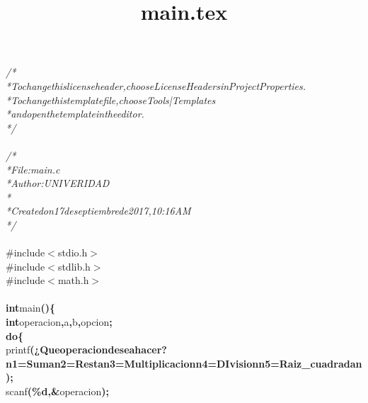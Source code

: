\documentclass[a4paper, 10pt]{article}
\title{main.tex}
\newcommand\SPC{\hspace*{0.6em}}
\newcommand\BS{\mbox{\char 92}}
\newcommand\QOT{\mbox{\char 34}}
\newcommand{\CppAComment}[1]{\textit{\textcolor[rgb]{0.2,0.6,1}{#1}}}
\newcommand{\CppAIdentifier}[1]{#1}
\newcommand{\CppAPreprocessor}[1]{\textcolor[rgb]{0,0.5,0}{#1}}
\newcommand{\CppAReservedWord}[1]{\textbf{#1}}
\newcommand{\CppASpace}[1]{\colorbox[rgb]{1,1,1}{#1}}
\newcommand{\CppAString}[1]{\textbf{\textcolor[rgb]{0,0,1}{#1}}}
\newcommand{\CppASymbol}[1]{\textbf{\textcolor[rgb]{1,0,0}{#1}}}
\begin{document}
\begin{ttfamily}
\noindent
\CppAComment{/*}\\
\CppAComment{\SPC *\SPC To\SPC change\SPC this\SPC license\SPC header,\SPC choose\SPC License\SPC Headers\SPC in\SPC Project\SPC Properties.}\\
\CppAComment{\SPC *\SPC To\SPC change\SPC this\SPC template\SPC file,\SPC choose\SPC Tools\SPC |\SPC Templates}\\
\CppAComment{\SPC *\SPC and\SPC open\SPC the\SPC template\SPC in\SPC the\SPC editor.}\\
\CppAComment{\SPC */}\\
\\
\CppAComment{/*\SPC }\\
\CppAComment{\SPC *\SPC File:\SPC \SPC \SPC main.c}\\
\CppAComment{\SPC *\SPC Author:\SPC UNIVERIDAD}\\
\CppAComment{\SPC *}\\
\CppAComment{\SPC *\SPC Created\SPC on\SPC 17\SPC de\SPC septiembre\SPC de\SPC 2017,\SPC 10:16\SPC AM}\\
\CppAComment{\SPC */}\\
\\
\CppAPreprocessor{\#include\SPC $<$stdio.h$>$}\\
\CppAPreprocessor{\#include\SPC $<$stdlib.h$>$}\\
\CppAPreprocessor{\#include\SPC $<$math.h$>$}\\
\\
\CppAReservedWord{int}\CppASpace{\SPC }\CppAIdentifier{main}\CppASymbol{(}\CppASymbol{)}\CppASymbol{\{}\\
\CppASpace{\SPC \SPC \SPC \SPC }\CppAReservedWord{int}\CppASpace{\SPC }\CppAIdentifier{operacion}\CppASymbol{,}\CppAIdentifier{a}\CppASymbol{,}\CppASpace{\SPC }\CppAIdentifier{b}\CppASymbol{,}\CppASpace{\SPC }\CppAIdentifier{opcion}\CppASymbol{;}\\
\CppASpace{\SPC \SPC \SPC \SPC }\CppAReservedWord{do}\CppASymbol{\{}\\
\CppASpace{\SPC \SPC \SPC \SPC }\CppAIdentifier{printf}\CppASymbol{(}\CppAString{\QOT ¿Que\SPC operacion\SPC desea\SPC hacer?\BS n\SPC 1=Suma\BS n\SPC 2=Resta\BS n\SPC 3=Multiplicacion\BS n\SPC 4=DIvision\BS n\SPC 5=Raiz\_cuadrada\BS n\QOT }\CppASymbol{)}\CppASymbol{;}\\
\CppASpace{\SPC \SPC \SPC \SPC }\CppAIdentifier{scanf}\CppASymbol{(}\CppAString{\QOT \%d\QOT }\CppASymbol{,}\CppASymbol{\&}\CppAIdentifier{operacion}\CppASymbol{)}\CppASymbol{;}\\

\end{ttfamily}
\end{document}
